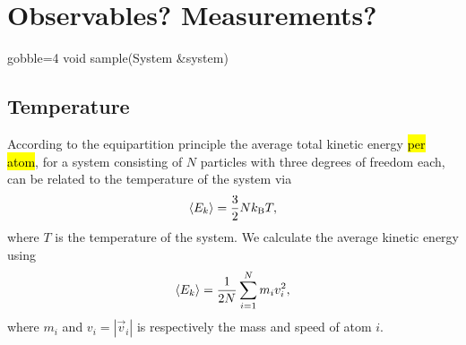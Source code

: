 \section{Observables? Measurements?}
% 
% 
%
%
%
\begin{listing}[!htb]%
\begin{cppcode*}{gobble=4}
    void sample(System &system)
    {
    }
\end{cppcode*}%
\caption{%
    \hl{FINISH THIS LISTING}. Implementation of the function \texttt{sample} from \cref{list:simple_md_program}.%
    \label{list:sampling}%
}%
\end{listing}%


\subsection{Temperature}
According to the equipartition principle the average total kinetic energy \hl{per atom}, for a system consisting of $N$ particles with three degrees of freedom each, can be related to the temperature of the system via
\begin{align*}
    \Braket{E_k} = \frac{3}{2}Nk_\text{B}T,
\end{align*}
where $T$ is the temperature of the system. We calculate the average kinetic energy using
\begin{align*}
    \Braket{E_k} = \frac{1}{2N}\sum_{i=1}^N m_i v_i^2,
\end{align*}
where $m_i$ and $v_i = |\vec v_i|$ is respectively the mass and speed of atom $i$. 

